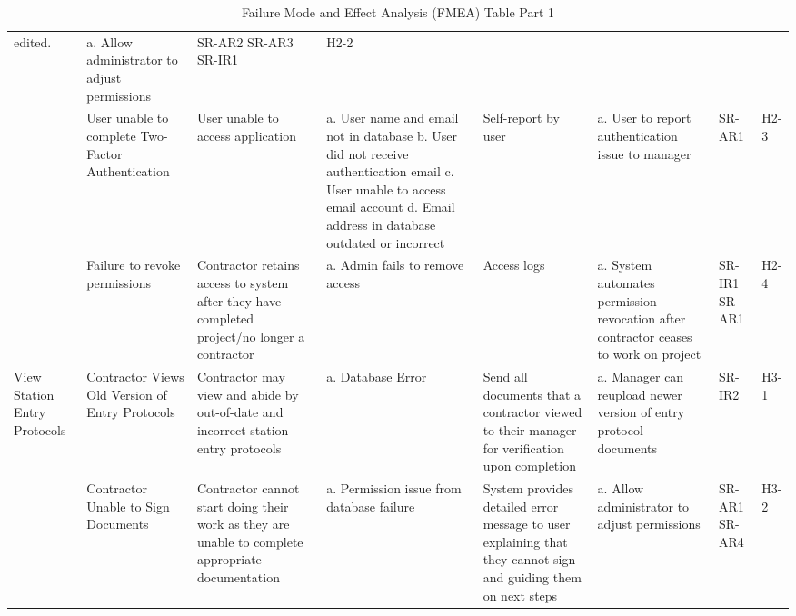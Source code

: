 \documentclass{article}
\begin{document}
\begin{table}[H]
{\begin{tabular}{|>{\raggedright}p{2.0cm}|>{\raggedright}p{2.0cm}|>{\raggedright}p{2.6cm}|>{\raggedright}p{4cm}|>{\raggedright}p{3cm}|>{\raggedright}p{4cm}|>{\raggedright}p{1.5cm}|p{1.5cm}|}
      edited. & a. Allow administrator to adjust permissions &
      SR-AR2 \newline SR-AR3 \newline SR-IR1 & H2-2 \\
      \cline{2-8}
      & User unable to complete Two-Factor Authentication & User
      unable to access application & a. User name and email not in
      database \newline b. User did not receive authentication email
      \newline c. User unable to access email account \newline d.
      Email address in database outdated or incorrect
      & Self-report by user & a. User to report authentication issue
      to manager & SR-AR1 & H2-3 \\
      \cline{2-8}
      & Failure to revoke permissions & Contractor retains access to system
      after they have completed project/no longer a contractor & a.
      Admin fails to
      remove access & Access logs & a. System automates permission
      revocation after
      contractor ceases to work on project & SR-IR1 \newline SR-AR1 & H2-4\\
      \hline
      View Station Entry Protocols & Contractor Views Old Version of
      Entry Protocols & Contractor may view and abide by out-of-date
      and incorrect station entry protocols & a. Database Error &
      Send all documents that a contractor viewed to their manager
      for verification upon completion & a. Manager can reupload
      newer version of entry protocol documents & SR-IR2 & H3-1 \\
      \cline{2-8}
      & Contractor Unable to Sign Documents & Contractor cannot start
      doing their work as they are unable to complete appropriate
      documentation & a. Permission issue from database failure &
      System provides detailed error message to user explaining that
      they cannot sign and guiding them on next steps & a. Allow
      administrator to adjust permissions & SR-AR1 \newline SR-AR4 & H3-2 \\
      \hline
    \end{tabular}
  }
  \caption{Failure Mode and Effect Analysis (FMEA) Table Part 1}
\end{table}
\end{document}
